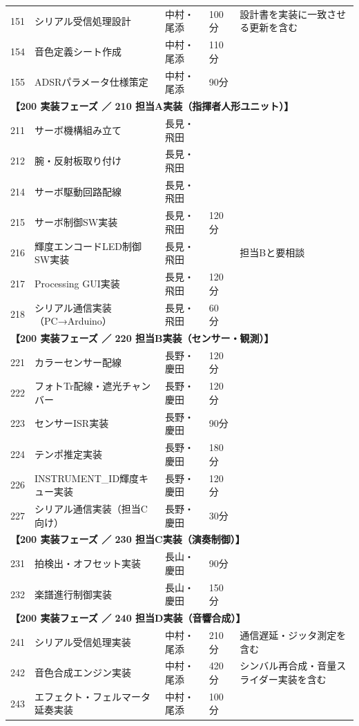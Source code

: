 \begin{longtable}{p{0.9cm}p{7cm}p{2.5cm}p{2cm}p{2cm}}
\midrule
151 & シリアル受信処理設計 & 中村・尾添 & 100分 & 設計書を実装に一致させる更新を含む \\
154 & 音色定義シート作成 & 中村・尾添 & 110分 &  \\
155 & ADSRパラメータ仕様策定 & 中村・尾添 & 90分 &  \\
\midrule
\multicolumn{5}{l}{\textbf{【200 実装フェーズ ／ 210 担当A実装（指揮者人形ユニット）】}} \\
\midrule
211 & サーボ機構組み立て & 長見・飛田 &  &  \\
212 & 腕・反射板取り付け & 長見・飛田 &  &  \\
214 & サーボ駆動回路配線 & 長見・飛田 &  &  \\
215 & サーボ制御SW実装 & 長見・飛田 & 120 分 &  \\
216 & 輝度エンコードLED制御SW実装 & 長見・飛田 &  & 担当Bと要相談 \\
217 & Processing GUI実装 & 長見・飛田 & 120 分 &  \\
218 & シリアル通信実装（PC→Arduino） & 長見・飛田 & 60 分 &  \\
\midrule
\multicolumn{5}{l}{\textbf{【200 実装フェーズ ／ 220 担当B実装（センサー・観測）】}} \\
\midrule
221 & カラーセンサー配線 & 長野・慶田 & 120分 &  \\
222 & フォトTr配線・遮光チャンバー & 長野・慶田 & 120分 &  \\
223 & センサーISR実装 & 長野・慶田 & 90分 &  \\
224 & テンポ推定実装 & 長野・慶田 & 180分 &  \\
226 & INSTRUMENT\_ID輝度キュー実装 & 長野・慶田 & 120分 &  \\
227 & シリアル通信実装（担当C向け） & 長野・慶田 & 30分 &  \\
\midrule
\multicolumn{5}{l}{\textbf{【200 実装フェーズ ／ 230 担当C実装（演奏制御）】}} \\
\midrule
231 & 拍検出・オフセット実装 & 長山・慶田 & 90分 &  \\
232 & 楽譜進行制御実装 & 長山・慶田 & 150分 &  \\
\midrule
\multicolumn{5}{l}{\textbf{【200 実装フェーズ ／ 240 担当D実装（音響合成）】}} \\
\midrule
241 & シリアル受信処理実装 & 中村・尾添 & 210分 & 通信遅延・ジッタ測定を含む \\
242 & 音色合成エンジン実装 & 中村・尾添 & 420分 & シンバル再合成・音量スライダー実装を含む \\
243 & エフェクト・フェルマータ延奏実装 & 中村・尾添 & 100分 &  \\

\end{longtable}
